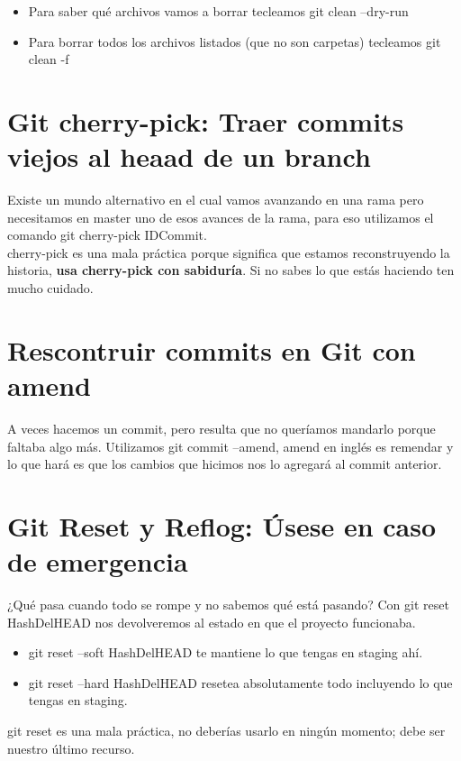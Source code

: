 \documentclass{article}
\begin{document}
\begin{itemize}
  \item Para saber qué archivos vamos a borrar tecleamos git clean --dry-run
  \item Para borrar todos los archivos listados (que no son carpetas) tecleamos
    git clean -f
\end{itemize}

\section{Git cherry-pick: Traer commits viejos al heaad de un branch}%
Existe un mundo alternativo en el cual vamos avanzando en una rama pero
necesitamos en master uno de esos avances de la rama, para eso utilizamos el
comando git cherry-pick IDCommit.\\

cherry-pick es una mala práctica porque significa que estamos reconstruyendo la
historia, \textbf{usa cherry-pick con sabiduría}. Si no sabes lo que estás
haciendo ten mucho cuidado.


\section{Rescontruir commits en Git con amend}%
A veces hacemos un commit, pero resulta que no queríamos mandarlo porque
faltaba algo más. Utilizamos git commit --amend, amend en inglés es remendar y
lo que hará es que los cambios que hicimos nos lo agregará al commit
anterior.\\


\section{Git Reset y Reflog: Úsese en caso de emergencia}%
¿Qué pasa cuando todo se rompe y no sabemos qué está pasando? Con git reset
HashDelHEAD nos devolveremos al estado en que el proyecto funcionaba.\\

\begin{itemize}
  \item git reset --soft HashDelHEAD te mantiene lo que tengas en staging ahí.
  \item git reset --hard HashDelHEAD resetea absolutamente todo incluyendo lo
    que tengas en staging.
\end{itemize}

git reset es una mala práctica, no deberías usarlo en ningún momento; debe ser
nuestro último recurso.
\end{document}
